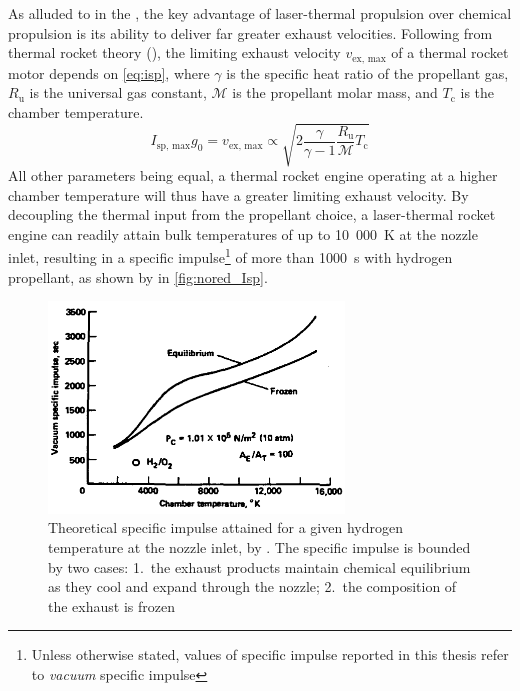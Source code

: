         As alluded to in the , the key advantage of laser-thermal propulsion over chemical propulsion is its ability to deliver far greater exhaust velocities. Following from thermal rocket theory (\textcite{zandbergenAE4S01ThermalRocket2020}), the limiting exhaust velocity $v_\text{ex, max}$ of a thermal rocket motor depends on \autoref{eq:isp}, where $\gamma$ is the specific heat ratio of the propellant gas, $R_\text{u}$ is the universal gas constant, $\mathcal{M}$ is the propellant molar mass, and $T_\text{c}$ is the chamber temperature.
        \begin{equation}
            I_\text{sp, max}g_0 = v_\text{ex, max} \propto \sqrt{2\frac{\gamma}{\gamma-1}\frac{R_\text{u}}{\mathcal{M}}T_\text{c}} \label{eq:isp}
        \end{equation}
        All other parameters being equal, a thermal rocket engine operating at a higher chamber temperature will thus have a greater limiting exhaust velocity. By decoupling the thermal input from the propellant choice, a laser-thermal rocket engine can readily attain bulk temperatures of up to 10~000~K at the nozzle inlet, resulting in a specific impulse\footnote{Unless otherwise stated, values of specific impulse reported in this thesis refer to \emph{vacuum} specific impulse} of more than 1000~s with hydrogen propellant, as shown by \textcite{noredApplicationHighPower1976} in \autoref{fig:nored_Isp}.

        \begin{figure}[h]
            \centering
            \includegraphics[width=0.7\textwidth]{assets/2 background/nored_ltpIsp.png}
            \caption[Theoretical specific impulse attained for a given hydrogen temperature]{Theoretical specific impulse attained for a given hydrogen temperature at the nozzle inlet, by \textcite{noredApplicationHighPower1976}. The specific impulse is bounded by two cases: 1.~the exhaust products maintain chemical equilibrium as they cool and expand through the nozzle; 2.~the composition of the exhaust is frozen}
            \label{fig:nored_Isp}
        \end{figure}

